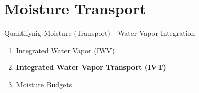 \section{Moisture Transport}

\begin{frame}{Quantifynig Moisture (Transport) - Water Vapor Integration}

  {\large
    \begin{enumerate}
    \item Integrated Water Vapor (IWV) \cite{gimeno_atmospheric_2014, eiras-barca_seasonal_2016, bao_interpretation_2006, ma_atmospheric_nodate}
    \item \textbf{Integrated Water Vapor Transport (IVT)} \cite{zhu_proposed_1998, sousa_north_2020, jiang_impact_2017, ayantobo_integrated_2022, allan_diagnosing_2016, ralph_dropsonde_2017, ralph_scale_2019}
    \item Moisture Budgets \cite{seager_mechanisms_2020, yang_moisture_2022}
  \end{enumerate}
}
\end{frame}

